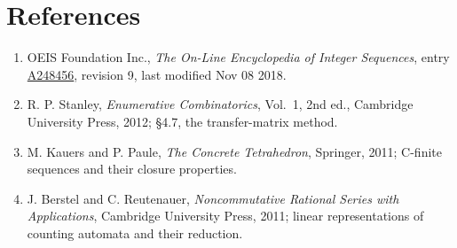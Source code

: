 \documentclass[11pt]{article}
\theoremstyle{definition}
\begin{document}
\section{References}

\begin{enumerate}

\item OEIS Foundation Inc., \emph{The On-Line Encyclopedia of Integer Sequences}, entry \href{https://oeis.org/A248456}{A248456}, revision 9, last modified Nov 08 2018.

\item R. P. Stanley, \emph{Enumerative Combinatorics}, Vol.~1, 2nd ed., Cambridge University Press, 2012; \S4.7, the transfer-matrix method.

\item M. Kauers and P. Paule, \emph{The Concrete Tetrahedron}, Springer, 2011; C-finite sequences and their closure properties.

\item J. Berstel and C. Reutenauer, \emph{Noncommutative Rational Series with Applications}, Cambridge University Press, 2011; linear representations of counting automata and their reduction.

\end{enumerate}
\end{document}
